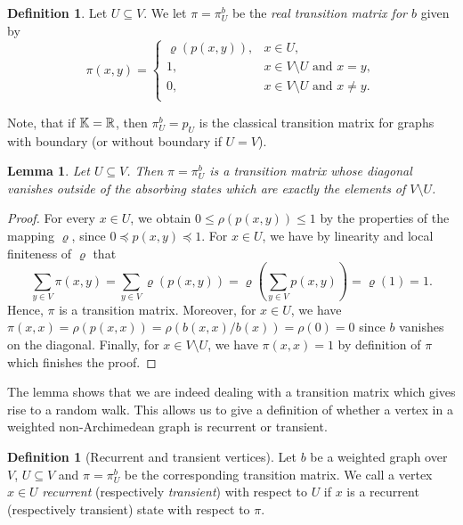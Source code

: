 \documentclass[a4paper,oneside, 12pt]{amsart}
\numberwithin{theorem}{section}
\newtheorem{lemma}[theorem]{Lemma}
\theoremstyle{definition}
\newtheorem{definition}[theorem]{Definition}
\newcommand{\map}{\varrho}
\newcommand{\prob}{\pi}
\newcommand{\subsV}{U}
\begin{document}
{\begin{definition}\label{def::rhoU}
Let     $\subsV\subseteq V$. We  let $ \pi=\pi_{U}^{b} $ be the \emph{real transition matrix for $ b $}  given by
$$
\prob(x,y)=
\begin{cases}
\map(p(x,y)), &x\in \subsV,\\
1,& x\in V\setminus \subsV\mbox{ and }x=y,\\
0,& x\in V\setminus \subsV\mbox{ and }x\ne y.\\
\end{cases}
$$
\end{definition}

Note, that if $\Bbb K=\Bbb R$, then $\pi^{b}_{U}=p_{U}$ is the classical  transition matrix for graphs with boundary (or without boundary if $\subsV=V$).

\begin{lemma}\label{lem::absStates}
	Let   $\subsV\subseteq V$. Then $\pi=\pi_{U}^{b}$ is a transition matrix whose diagonal vanishes outside of the absorbing states which are exactly  the elements of $ V\setminus\subsV $.
\end{lemma}
\begin{proof}
	For every $x\in \subsV$, we obtain $0\le \rho(p(x,y))\le 1$ by the properties of the mapping $\map$, since $0\preceq p(x,y)\preceq 1$. For $ x\in \subsV $, we have  by  linearity and local finiteness of $\map$ that
	$$
	\sum_{y\in V} \prob(x,y)=\sum_{y\in V} \map(p(x,y))=\map\left(\sum_{y\in V} p(x,y)\right)=\map(1)=1.
	$$
	Hence, $ \pi $ is a transition matrix. Moreover, for $ x\in \subsV $, we have
	$\prob(x,x)=\rho(p(x,x))=\rho(b(x,x)/b(x))=\rho(0)=0$ since $ b $ vanishes on the diagonal. Finally,  for $x\in V\setminus \subsV$, we have $\prob(x,x)=1$ by definition of $\pi$ which finishes the proof. 
\end{proof}

The lemma shows that we are indeed dealing with a transition matrix which gives rise to a random walk. 
This  allows us to give a  definition of whether a vertex in a weighted non-Archimedean graph is recurrent or transient.

\begin{definition}[Recurrent and transient vertices]
	Let $b$ be a weighted graph over $ V $,    $\subsV\subseteq V$ and $ \pi=\pi_{U}^{b} $ be the corresponding transition matrix. We call a vertex $ x\in U $ \emph{recurrent} (respectively \emph{transient}) with respect to $ U $ if $ x $ is a  recurrent (respectively transient) state with respect to $ \pi $.
\end{definition}


}
\end{document}
